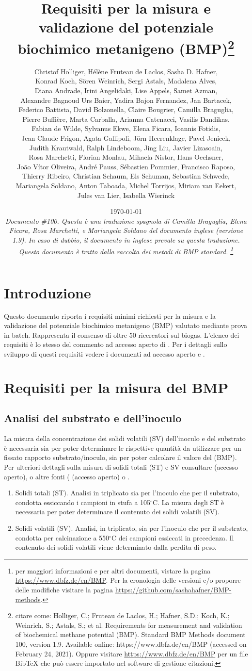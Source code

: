 \documentclass[]{article}
\title {Requisiti per la misura e validazione del potenziale biochimico metanigeno (BMP)\footnote{
  citare come: 
Holliger, C.; Fruteau de Laclos, H.; Hafner, S.D.; Koch, K.; Weinrich, S.; Astals, S.; et al. Requirements for measurement and validation of biochemical methane potential (BMP). Standard BMP Methods document 100, version 1.9. Available online: https://www.dbfz.de/en/BMP (accessed on February 24, 2021).
\newline
  Oppure visitare \url{https://www.dbfz.de/en/BMP} per un file BibTeX che può essere importato nel software di gestione citazioni.
}}
\author{
Christof Holliger, 
H{\'e}l{\`e}ne Fruteau de Laclos,
Sasha D. Hafner,\\
Konrad Koch,
S{\"o}ren Weinrich,
Sergi Astals, 
Madalena Alves, \\ 
Diana Andrade,
Irini Angelidaki,
Lise Appels, 
Samet Azman, \\
Alexandre Bagnoud
Urs Baier,
Yadira Bajon Fernandez,
Jan Bartacek,\\
Federico Battista,
David Bolzonella,
Claire Bougrier,
Camilla Braguglia, \\
Pierre Buffi{\`e}re,
Marta Carballa,
Arianna Catenacci,
Vasilis Dandikas, \\
Fabian de Wilde,
Sylvanus Ekwe,
Elena Ficara,
Ioannis Fotidis,\\
Jean-Claude Frigon,
Agata Gallipoli,
J{\"o}rn Heerenklage,
Pavel Jenicek,\\
Judith Krautwald,
Ralph Lindeboom,
Jing Liu,
Javier Lizasoain, \\
Rosa Marchetti,
Florian Monlau,
Mihaela Nistor,
Hans Oechsner,\\
Jo{\~a}o V{\'i}tor Oliveira,
Andr{\'e} Pauss,
S{\'e}bastien Pommier,
Francisco Raposo, \\
Thierry Ribeiro,
Christian Schaum,
Els Schuman,
Sebastian Schwede, \\
Mariangela Soldano,
Anton Taboada,
Michel Torrijos,
Miriam van Eekert,\\
Jules van Lier, 
Isabella Wierinck
}
\date{\today \\
\bigskip
\textit{
  Documento \#100.
  Questa è una traduzione spagnola di Camilla Braguglia, Elena Ficara, Rosa Marchetti, e Mariangela Soldano del documento inglese (versione 1.9). In caso di dubbio, il documento in inglese prevale su questa traduzione.  
  Questo documento è tratto dalla raccolta dei metodi di BMP standard.
    \footnote{per maggiori informazioni e per altri documenti, vistare la pagina \url{https://www.dbfz.de/en/BMP}. 
    Per la cronologia delle versioni e/o proporre delle modifiche visitare la pagina \url{https://github.com/sashahafner/BMP-methods}.}
}
}
\begin{document}
\maketitle

\section{Introduzione}
Questo documento riporta i requisiti minimi richiesti per la misura e la validazione del potenziale biochimico metanigeno (BMP) valutato mediante prova in batch.
Rappresenta il consenso di oltre 50 ricercatori sul biogas.
L'elenco dei requisiti è lo stesso del commento ad accesso aperto di \citet{holligerStandardizationBiomethanePotential2021}.
Per i dettagli sullo sviluppo di questi requisiti vedere i documenti ad accesso aperto \citet{holligerStandardizationBiomethanePotential2016} e \citet{hafnerImprovingInterlaboratoryReproducibility2020}. 

\section{Requisiti per la misura del BMP}
\label{sec:requirements}
\subsection{Analisi del substrato e dell’inoculo}
\label{sec:analysis}
La misura della concentrazione dei solidi volatili (SV) dell’inoculo e del substrato è necessaria sia per poter determinare le rispettive quantità da utilizzare per un fissato rapporto substrato/inoculo, sia per poter calcolare il valore del (BMP).
   Per ulteriori dettagli sulla misura di solidi totali (ST) e SV consultare \citet{epaMethod1684Total2001} (accesso aperto), o altre fonti (\citet{strachDeterminationTotalSolids2020} (accesso aperto) o \citet{bairdStandardMethodsExamination2017}. 
  \begin{enumerate}
    \item Solidi totali (ST). Analisi in triplicato sia per l’inoculo che per il substrato, condotta essiccando i campioni in stufa a 105$^\circ$C. La misura degli ST è necessaria per poter determinare il contenuto dei solidi volatili (SV).
    \item Solidi volatili (SV). Analisi, in triplicato, sia per l’inoculo che per il substrato, condotta per calcinazione a 550$^\circ$C dei campioni essiccati in precedenza. Il contenuto dei solidi volatili viene determinato dalla perdita di peso.

  \end{enumerate}
\end{document}
